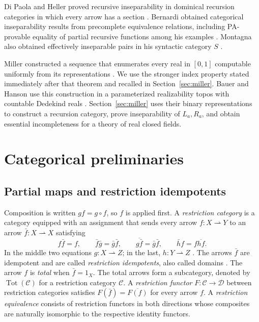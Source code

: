 \documentclass[11pt]{article}
\begin{document}
Di Paola and Heller proved recursive inseparability in dominical
recursion categories in which every arrow has a section
\cite[Theorem 8.15]{DPH}. Bernardi obtained categorical inseparability
results from precomplete equivalence relations, including PA-provable
equality of partial recursive functions among his examples
\cite[pp.~125--128]{Bernardi}.
Montagna also obtained effectively inseparable pairs in his syntactic
category $S$
\cite[Remark 3.1]{Montagna}.


Miller constructed a sequence that enumerates every real in $[0,1]$
computable uniformly from its representations \cite[Theorem~6.3]{Miller2004}.
We use the stronger index property stated immediately after that
theorem and recalled in Section~\ref{sec:miller}.
Bauer and Hanson use this construction in a parameterized realizability
topos with countable Dedekind reals \cite{BauerHanson}.
Section~\ref{sec:miller} uses their binary representations to construct a recursion category,
prove inseparability of $L_a,R_a$, and obtain essential incompleteness
for a theory of real closed fields.

\section{Categorical preliminaries}\label{sec:preliminaries}

\subsection{Partial maps and restriction idempotents}

Composition is written $gf=g\circ f$, so $f$ is applied first.
A \emph{restriction category} is a category equipped with an assignment
that sends every arrow
$f:X\rightharpoonup Y$ to an arrow
$\bar f:X\rightharpoonup X$ satisfying
\[
 f\bar f=f,\qquad
 \bar f\bar g=\bar g\bar f,\qquad
 \overline{g\bar f}=\bar g\bar f,\qquad
 \bar h f=f\overline{hf}.
\]
In the middle two equations $g:X\rightharpoonup Z$; in the last,
$h:Y\rightharpoonup Z$ \cite{CockettLack}.
The arrows $\bar f$ are idempotent and are called
\emph{restriction idempotents}, also called domains
\cite[Section~5]{Heller}.
The arrow $f$ is \emph{total} when $\bar f=1_X$.
The total arrows form a subcategory, denoted by
$\operatorname{Tot}(\mathcal C)$ for a restriction category $\mathcal C$.
A \emph{restriction functor} $F:\mathcal C\to\mathcal D$ between
restriction categories satisfies $F(\bar f)=\overline{F(f)}$ for every
arrow $f$. A \emph{restriction equivalence} consists of restriction
functors in both directions whose composites are naturally isomorphic
to the respective identity functors.
\end{document}
